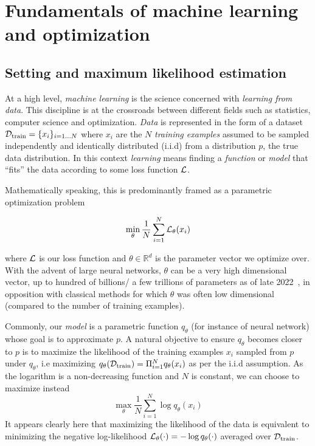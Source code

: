 \section{Fundamentals of machine learning and optimization}
\label{sec:ml}

\subsection{Setting and maximum likelihood estimation}

At a high level, \emph{machine learning} is the science concerned with \emph{learning from data}. This discipline is at the crossroads between different fields such as statistics, computer science and optimization. \emph{Data} is represented in the form of a dataset ${\mathcal{D}}_\text{train} = \{x_i\}_{i=1\dots N}$ where $x_i$ are the $N$ \emph{training examples} assumed to be sampled independently and identically distributed (i.i.d) from a distribution $p$, the true data distribution. In this context \emph{learning} means finding a \emph{function} or \emph{model} that ``fits'' the data according to some loss function ${\mathcal{L}}$.

Mathematically speaking, this is predominantly framed as a parametric optimization problem

$$\min_\theta \frac{1}{N} \sum_{i=1}^N {\mathcal{L}}_\theta(x_i)$$

where ${\mathcal{L}}$ is our loss function and $\theta \in \mathbb{R}^d$ is the parameter vector we optimize over. With the advent of large neural networks, $\theta$ can be a very high dimensional vector, up to hundred of billions/ a few trillions of parameters as of late 2022~\citep{chowdhery2022palm, switch2022fedus}, in opposition with classical methods for which $\theta$ was often low dimensional (compared to the number of training examples).

Commonly, our \emph{model} is a parametric function $q_\theta$ (for instance of neural network) whose goal is to approximate $p$. A natural objective to ensure $q_\theta$ becomes closer to $p$ is to maximize the likelihood of the training examples $x_i$ sampled from $p$ under $q_\theta$, i.e maximizing $q_\theta({\mathcal{D}}_\text{train}) = \Pi_{i=1}^N q_\theta(x_i)$ as per the i.i.d assumption. As the logarithm is a non-decreasing function and $N$ is constant, we can choose to maximize instead
$$\max_\theta \frac{1}{N} \sum_{i=1}^N \log q_\theta(x_i)$$
It appears clearly here that maximizing the likelihood of the data is equivalent to minimizing the negative log-likelihood ${\mathcal{L}}_\theta(\cdot) = - \log q_\theta(\cdot)$ averaged over ${\mathcal{D}}_\text{train}$.

